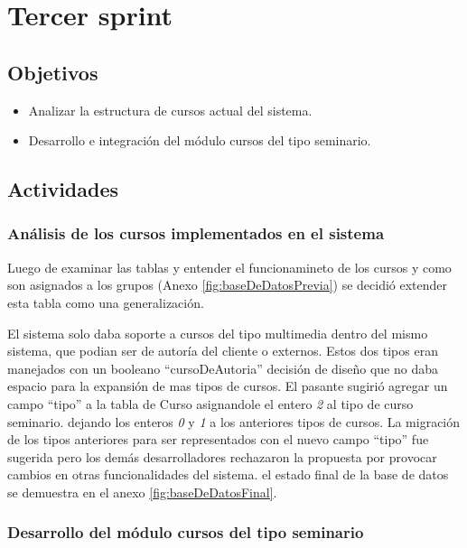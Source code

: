 \section{Tercer sprint} %
\label{sec:tercer_sprint}

\subsection{Objetivos}

\begin{itemize}
	\item Analizar la estructura de cursos actual del sistema.
	\item Desarrollo e integración del módulo cursos del tipo seminario.
\end{itemize}

\subsection{Actividades} %
\label{sub:actividades3}

\subsubsection{Análisis de los cursos implementados en el sistema}

Luego de examinar las tablas y entender el funcionamineto de los cursos y como son asignados a los grupos (Anexo \ref{fig:baseDeDatosPrevia}) se decidió extender esta tabla como una generalización.

El sistema solo daba soporte a cursos del tipo multimedia dentro del mismo sistema, que podian ser de autoría del cliente o externos. Estos dos tipos eran manejados con un booleano ``cursoDeAutoria'' decisión de diseño que no daba espacio para la expansión de mas tipos de cursos. El pasante sugirió agregar un campo ``tipo'' a la tabla de Curso asignandole el entero \emph{2} al tipo de curso seminario. dejando los enteros \emph{0} y \emph{1} a los anteriores tipos de cursos. La migración de los tipos anteriores para ser representados con el nuevo campo ``tipo'' fue sugerida pero los demás desarrolladores rechazaron la propuesta por provocar cambios en otras funcionalidades del sistema. el estado final de la base de datos se demuestra en el anexo \ref{fig:baseDeDatosFinal}.

\subsubsection{Desarrollo del módulo cursos del tipo seminario}

